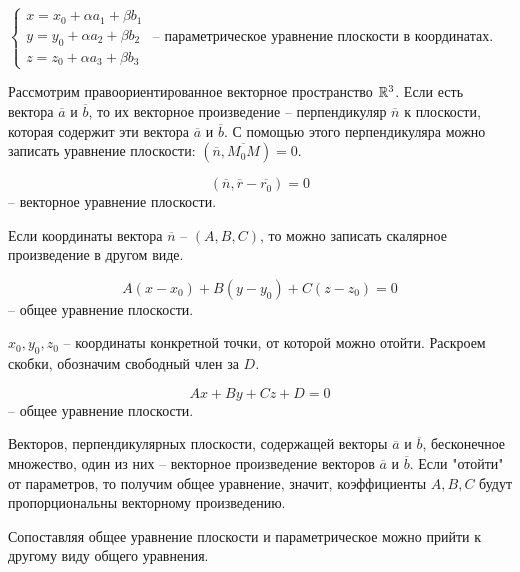 	\begin{Def}
		$ \begin{cases}
			x = x_0 + \alpha a_1 +  \beta b_1\\
			y = y_0 + \alpha a_2 + \beta b_2 \\
			z = z_0 + \alpha a_3 + \beta b_3
		\end{cases} $ -- параметрическое уравнение плоскости в координатах.
	\end{Def}

	Рассмотрим правоориентированное векторное пространство $\mathbb{R}^3$. Если есть вектора $\overline{a}$ и $\overline{b}$, то их векторное произведение -- перпендикуляр $\overline{n}$ к плоскости, которая содержит эти вектора $\overline{a}$ и $\overline{b}$. С помощью этого перпендикуляра можно записать уравнение плоскости: $(\overline{n}, \overline{M_0M}) = 0$.

	\begin{Def}
		$$(\overline{n}, \overline{r} - \overline{r_0}) = 0$$ -- векторное уравнение плоскости.
	\end{Def}

	\begin{figure}[h]
		\centering
		\def\svgwidth{0.5\columnwidth}
		
	\end{figure}

	Если координаты вектора $\overline{n}$ -- $(A, B, C)$, то можно записать скалярное произведение в другом виде.

	\begin{Def}
		$$A(x- x_0) + B(y - y_0) + C(z - z_0) = 0$$ -- общее уравнение плоскости.
	\end{Def}

	$x_0,  y_0, z_0$ -- координаты конкретной точки, от которой можно отойти. Раскроем скобки, обозначим свободный член за $D$.
	
	\begin{Def}
		$$Ax + By + Cz + D = 0$$ -- общее уравнение плоскости.
	\end{Def}

	Векторов, перпендикулярных плоскости, содержащей векторы $\overline{a}$ и $\overline{b}$, бесконечное множество, один из них -- векторное произведение векторов $\overline{a}$ и $\overline{b}$. Если "отойти"  от параметров, то получим общее уравнение, значит, коэффициенты $A, B, C$ будут пропорциональны векторному произведению.  

	Сопоставляя общее уравнение плоскости и параметрическое можно прийти к другому виду общего уравнения.

